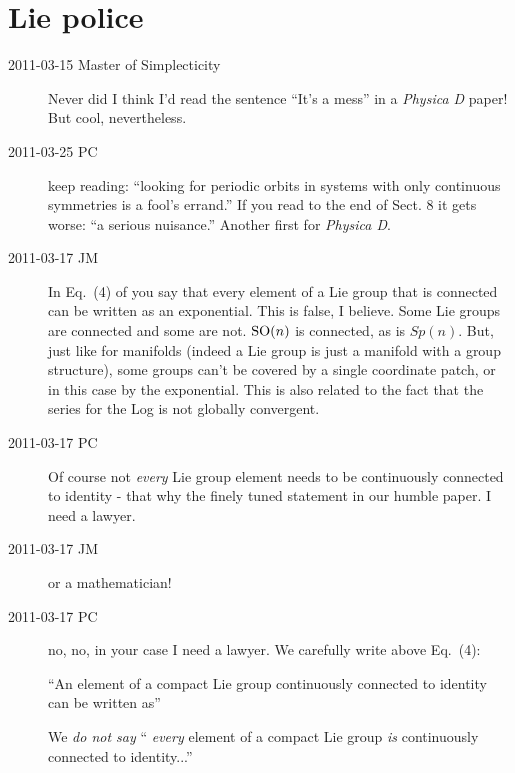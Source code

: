 
\chapter{Lie police}
\label{sect:LiePolice}

\renewcommand{\LieEl}{\ensuremath{g}}  %
\renewcommand{\ssp}{x}

\begin{description}
\item[2011-03-15
{Master of Simplecticity}]
Never did I think I'd read the sentence ``It's a mess'' in a
\emph{Physica D} paper! But cool, nevertheless.

\item[2011-03-25 PC] keep reading:
``looking for periodic orbits in systems with only continuous symmetries
is a fool's errand.'' If you read to the end of Sect. 8 it gets worse:
``a serious nuisance.'' Another first for \emph{Physica D}.

\item[2011-03-17 JM]
In Eq.~(4) of  you say that every element of a Lie group
that is connected can be written as an exponential. This is false, I
believe. Some Lie groups are connected and some are not. $\textrm{SO}(n)$ is
connected, as is $Sp(n)$. But, just like for manifolds (indeed a Lie
group is just a manifold with a group structure), some groups can't be
covered by a single coordinate patch, or in this case by the exponential.
This is also related to the fact that the series for the  Log is not
globally convergent.

\item[2011-03-17 PC]
Of course not {\em every} Lie group element needs to be continuously
connected to identity - that why the finely tuned statement in our humble
paper.
I need a lawyer.

\item[2011-03-17 JM] or a mathematician!

\item[2011-03-17 PC]
no, no, in your case I need a lawyer. We carefully
write above Eq.~(4):

``An element of a compact Lie group
continuously connected to identity can be written as''

We \emph{do not say}
``\emph{\color{red} every} element of a compact Lie group
\emph{\color{red} is} continuously connected to identity...''


\end{description}
